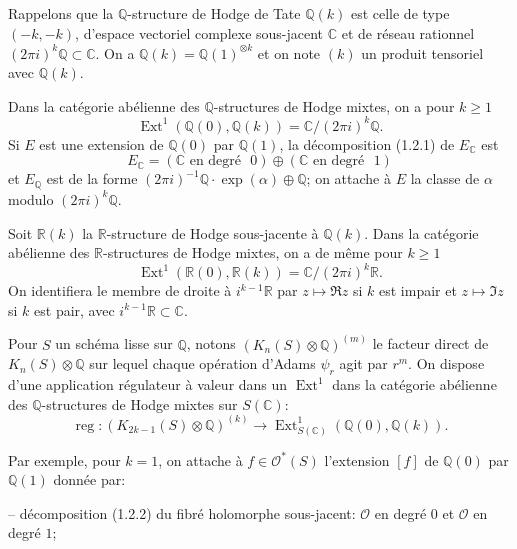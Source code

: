 \documentclass[12pt,a4paper]{article}
\theoremstyle{plain}
\theoremstyle{definition}
\theoremstyle{remark}
\DeclareMathOperator{\Ext}{Ext}
\DeclareMathOperator{\reg}{reg}
\newcommand{\Q}{\mathbb{Q}}
\newcommand{\R}{\mathbb{R}}
\newcommand{\C}{\mathbb{C}}
\begin{document}
\subsection{}

Rappelons que la $\Q$-structure de Hodge de Tate $\Q(k)$ est celle de type $(-k,-k)$, d'espace vectoriel complexe sous-jacent $\C$ et de r{\'e}seau rationnel $(2\pi i)^k\Q\subset\C$. On a $\Q(k)=\Q(1)^{\otimes k}$ et on note $(k)$ un produit tensoriel avec $\Q(k)$.

Dans la cat{\'e}gorie ab{\'e}lienne des $\Q$-structures de Hodge mixtes, on a pour $k\geq 1$
\begin{equation*}
\Ext^1(\Q(0),\Q(k)) = \C/(2\pi i)^k\Q.
\end{equation*}
Si $E$ est une extension de $\Q(0)$ par $\Q(1)$, la d{\'e}composition (1.2.1) de $E_\C$ est
\begin{equation*}
E_\C = (\C\text{ en degr{\'e} }0)\oplus(\C\text{ en degr{\'e} }1)
\end{equation*}
et $E_\Q$ est de la forme $(2\pi i)^{-1}\Q\cdot\exp(\alpha)\oplus\Q$; on attache {\`a} $E$ la classe de $\alpha$ modulo $(2\pi i)^k\Q$.

Soit $\R(k)$ la $\R$-structure de Hodge sous-jacente {\`a} $\Q(k)$. Dans la cat{\'e}gorie ab{\'e}lienne des $\R$-structures de Hodge mixtes, on a de m{\^e}me pour $k\geq 1$
\begin{equation*}
\Ext^1(\R(0),\R(k)) = \C/(2\pi i)^k\R.
\end{equation*}
On identifiera le membre de droite {\`a} $i^{k-1}\R$ par $z\mapsto\Re z$ si $k$ est impair et $z\mapsto\Im z$ si $k$ est pair, avec $i^{k-1}\R\subset\C$.

Pour $S$ un sch{\'e}ma lisse sur $\Q$, notons $(K_n(S)\otimes\Q)^{(m)}$ le facteur direct de $K_n(S)\otimes\Q$ sur lequel chaque op{\'e}ration d'Adams $\psi_r$ agit par $r^m$. On dispose d'une application r{\'e}gulateur {\`a} valeur dans un $\Ext^1$ dans la cat{\'e}gorie ab{\'e}lienne des $\Q$-structures de Hodge mixtes sur $S(\C)$:
\begin{equation*}
\reg : (K_{2k-1}(S)\otimes\Q)^{(k)} \longrightarrow \Ext^1_{S(\C)}(\Q(0),\Q(k)).
\end{equation*}

Par exemple, pour $k=1$, on attache {\`a} $f\in\mathcal{O}^*(S)$ l'extension $[f]$ de $\Q(0)$ par $\Q(1)$ donn{\'e}e par:

-- d{\'e}composition (1.2.2) du fibr{\'e} holomorphe sous-jacent: $\mathcal{O}$ en degr{\'e} $0$ et $\mathcal{O}$ en degr{\'e} $1$;
\end{document}
